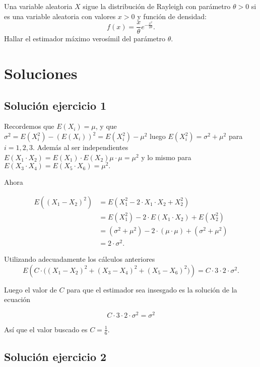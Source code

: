 \documentclass[
]{article}
\begin{document}
Una variable aleatoria \(X\) sigue la distribución de Rayleigh con
parámetro \(\theta >0\) si es una variable aleatoria con valores \(x>0\)
y función de densidad: \[
f(x)=\frac{x}{\theta} e^{-\frac{x^2}{2\theta}}.
\] Hallar el estimador máximo verosímil del parámetro \(\theta\).

\hypertarget{soluciones}{%
\section{Soluciones}\label{soluciones}}

\hypertarget{soluciuxf3n-ejercicio-1}{%
\subsection{Solución ejercicio 1}\label{soluciuxf3n-ejercicio-1}}

Recordemos que \(E(X_i)=\mu\), y que
\(\sigma^2=E(X_i^2)-\left(E(X_i)\right)^2=E(X_i^2)-\mu^2\) luego
\(E(X_i^2)=\sigma^2+\mu^2\) para \(i=1,2,3\). Además al ser
independientes\\
\(E(X_1\cdot X_{2})=E(X_1)\cdot E(X_2)\mu\cdot\mu=\mu^2\) y lo mismo
para \(E(X_3\cdot X_{4})=E(X_5\cdot X_{6})=\mu^2.\)

Ahora

\[
\begin{array}{rl}
E\left(\left(X_{1}-X_{2}\right)^2\right) & =
E\left(X_{1}^2-2\cdot X_1\cdot X_{2}+X_{2}^2\right)\\
& = E\left(X_{1}^2\right)-2\cdot E(X_1\cdot X_{2})+E\left(X_{2}^2\right)\\
& = (\sigma^2+\mu^2)-2\cdot (\mu\cdot\mu)+ (\sigma^2+\mu^2)\\
& =2\cdot\sigma^2. 
\end{array}
\]

Utilizando adecuadamente los cálculos anteriores \[
E\left(C\cdot\bigl({(X_1 -X_2)}^2 +{(X_3 -X_4)}^2 + {(X_5 -X_6)}^2\bigr)\right)=C\cdot 3\cdot 2\cdot \sigma^2.
\]

Luego el valor de \(C\) para que el estimador sea insesgado es la
solución de la ecuación

\[C\cdot 3\cdot 2\cdot \sigma^2=\sigma^2\]

Así que el valor buscado es \(C=\frac16.\)

\hypertarget{soluciuxf3n-ejercicio-2}{%
\subsection{Solución ejercicio 2}\label{soluciuxf3n-ejercicio-2}}
\end{document}
